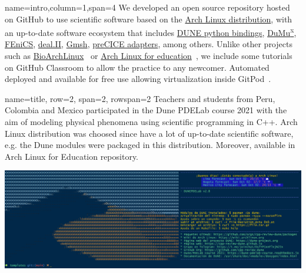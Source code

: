 \documentclass[
	paper=a0,
	style=ruled, %
	]{bfhsciposter}
\begin{document}
\begin{tcbposter}[
		poster={
				columns=4,
				rows=7,
				spacing=1cm,
			},]

	\begin{posterboxenv}[BFH-abstract,title=Abstract]{name=intro,column=1,span=4}
		We developed an open source repository hosted on GitHub to use
		scientific software based on the
		\href{https://archlinux.org}{Arch Linux distribution},
		with an up-to-date software ecosystem that includes
		\href{https://dune-project.org/doc/gettingstarted}{DUNE python bindings},
		\href{https://dumux.org}{DuMu\textsuperscript{x}},
		\href{https://fenicsproject.org}{FEniCS},
		\href{https://www.dealii.org}{deal.II},
		\href{https://gmsh.info}{Gmsh},
		\href{https://precice.org/adapters-overview.html}{preCICE adapters},
		among others.
		Unlike other projects such as
		\href{https://github.com/BioArchLinux}{BioArchLinux}~\cite{bioarchlinux_2022}
		or \href{https://github.com/arch4edu}{Arch Linux for education}~\cite{arch4edu2022},
		we include some tutorials on GitHub Classroom to allow the
		practice to any newcomer.
		Automated deployed and available for free use allowing
		virtualization inside GitPod~\cite{gitpod_2022}.
	\end{posterboxenv}

	\begin{posterboxenv}[BFH-framed, title=C++ Review DUNE]{name=title, row=2, span=2, rowspan=2}
		Teachers and students from Peru, Colombia and Mexico participated
		in the Dune PDELab course 2021 with the aim of modeling physical
		phenomena using scientific programming in C++.
		Arch Linux distribution was choosed since have a lot of
		up-to-date scientific software, e.g. the Dune modules were
		packaged in this distribution.
		Moreover, available in Arch Linux for Education
		repository.

		\includegraphics[width=\linewidth]{splash}
	\end{posterboxenv}


\end{tcbposter}
\end{document}
